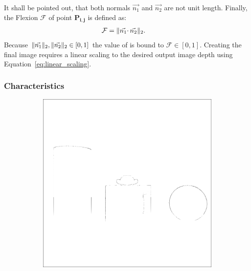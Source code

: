 It shall be pointed out, that both normals $\vec{n_1}$ and $\vec{n_2}$ are not unit length.
Finally, the Flexion $\mathcal{F}$ of point $\mathbf{P_{i,j}}$ is defined as:
\begin{align}
    \mathcal{F} &= \lVert\vec{n_1} \cdotp \vec{n_2}\rVert_{2}\text{.}
\end{align}
Because $\lVert\vec{n_1}\rVert_{2},\lVert\vec{n_2}\rVert_{2} \in [0,1]$ the value of is bound to $\mathcal{F} \in [0, 1]$.
Creating the final image requires a linear scaling to the desired output image depth using Equation~\ref{eq:linear_scaling}.

\subsubsection*{Characteristics}

\begin{figure}[H]
    \begin{subfigure}[t]{0.32\textwidth}
        \includegraphics[width=\linewidth]{chapter04/img/flexion-0001.png}
    \end{subfigure}
    \begin{subfigure}[t]{0.32\textwidth}

\end{subfigure}
\end{figure}
